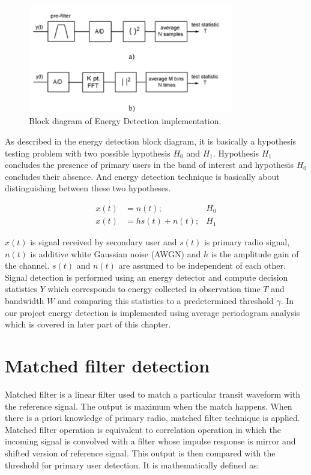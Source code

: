 \begin{figure}[h]
\centering
\includegraphics[width=0.8\textwidth]{../images/energyDetection}
\caption[Block diagram of Energy Detection implementatio]{Block diagram 
of Energy Detection implementation{\cite{cabric06}}.}
\label{energyDetection}
\end{figure}

As described in the energy detection block diagram, it is basically a hypothesis
testing problem with two possible hypothesis $H_0$ and $H_1$. Hypothesis $H_1$ concludes 
the presence of primary users in the band of interest and hypothesis $H_0$ 
concludes their absence. And energy detection technique is basically about 
distinguishing between these two hypotheses\cite{sarijari09}.


\begin{align}
x(t) & = n(t); & H_0 \nonumber \\
x(t) & = hs(t)+n(t); & H_1 \nonumber
\end{align}

$x(t)$ is signal received by secondary user and $s(t)$ is primary radio 
signal, $n(t)$ is additive white Gaussian noise (AWGN) and $h$ is the amplitude gain
of the channel. $s(t)$ and $n(t)$ are assumed to be independent of each other. 
Signal detection is performed using an energy detector and compute decision 
statistics $Y$ which corresponds to energy collected in observation time $T$ and 
bandwidth $W$ and comparing this statistics to a predetermined threshold
$\gamma$. In our project energy 
detection is implemented using average periodogram analysis which is covered in 
later part of this chapter.


\section{Matched filter detection}
Matched filter is a linear filter used to match a particular transit waveform 
with the reference signal. The output is maximum when the match happens. When 
there is a priori knowledge of primary radio, matched filter technique is 
applied. Matched filter operation is equivalent to correlation operation in 
which the incoming signal is convolved with a filter whose impulse response is 
mirror and shifted version of reference signal. This output is then compared 
with the threshold for primary user detection. It is mathematically defined as:

